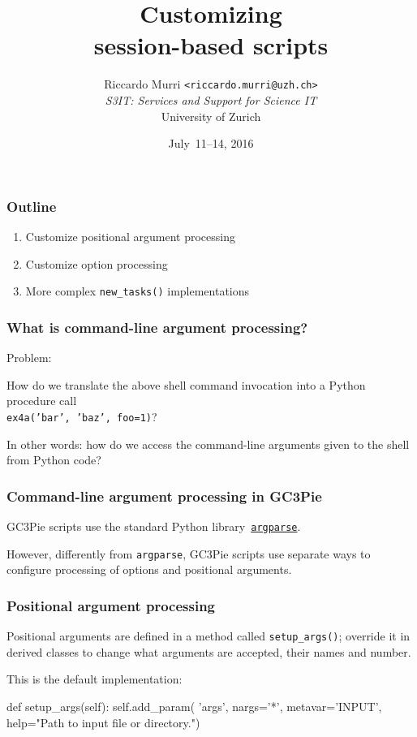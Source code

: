 \documentclass[english,serif,mathserif,xcolor=pdftex,dvipsnames,table]{beamer}
\title[Introduction]{%
  Customizing \\ session-based scripts
}
\author[R. Murri, S3IT UZH]{%
  Riccardo Murri \texttt{<riccardo.murri@uzh.ch>}
  \\[1ex]
  \emph{S3IT: Services and Support for Science IT}
  \\[1ex]
  University of Zurich
}
\date{July~11--14, 2016}
\begin{document}
\maketitle


\begin{frame}
  \frametitle{Outline}
  \begin{enumerate}
  \item Customize positional argument processing
  \item Customize option processing
  \item More complex \texttt{new\_tasks()} implementations
  \end{enumerate}
\end{frame}


\begin{frame}[fragile]
  \frametitle{What is command-line argument processing?}

  Problem:

  \+
  How do we translate the above shell command invocation into a
  Python procedure call \\ \texttt{ex4a('bar', 'baz', foo=1)}?

  \+
  In other words: how do we access the command-line arguments given
  to the shell from Python code?
\end{frame}


\begin{frame}
  \frametitle{Command-line argument processing in GC3Pie}

  GC3Pie scripts use the standard Python
  library~\href{https://docs.python.org/2/howto/argparse.html}{\texttt{argparse}}.

  \+
  However, differently from \texttt{argparse}, GC3Pie scripts use
  separate ways to configure processing of options and positional
  arguments.
\end{frame}

\begin{frame}[fragile]
  \frametitle{Positional argument processing}

  Positional arguments are defined in a method called
  \lstinline|setup_args()|; override it in derived classes to change
  what arguments are accepted, their names and number.

  \+
  This is the default implementation:
\begin{python}
  def setup_args(self):
    self.add_param(
      'args', nargs='*', metavar='INPUT',
      help="Path to input file or directory.")
\end{python}
\end{frame}
\end{document}
